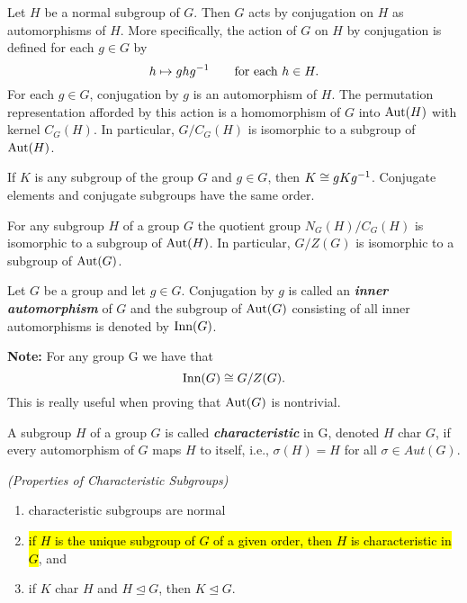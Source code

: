 \nl

\begin{prop}
Let $H$ be a normal subgroup of $G$. Then $G$ acts by conjugation on $H$ as automorphisms of $H$. More specifically, the action of $G$ on $H$ by conjugation is defined for each $g\in G$ by 
\[h\mapsto ghg^{-1}\qquad\text{for each } h\in H.\]
For each $g\in G$, conjugation by $g$ is an automorphism of $H$. The permutation representation afforded by this action is a homomorphism of $G$ into $\text{Aut}(H)$ with kernel $C_G(H)$. In particular, $G/C_G(H)$ is isomorphic to a subgroup of $\text{Aut}(H)$.
\end{prop}

\nl

\begin{cor}
If $K$ is any subgroup of the group $G$ and $g\in G$, then $K\cong gKg^{-1}$. Conjugate elements and conjugate subgroups have the same order.
\end{cor}

\nl

\begin{cor}
For any subgroup $H$ of a group $G$ the quotient group $N_G(H)/C_G(H)$ is isomorphic to a subgroup of $\text{Aut}(H)$. In particular, $G/Z(G)$ is isomorphic to a subgroup of $\text{Aut}(G)$.
\end{cor}

\nl

\begin{defn}
Let $G$ be a group and let $g\in G$. Conjugation by $g$ is called an \textbf{\textit{inner automorphism}} of $G$ and the subgroup of $\text{Aut}(G)$ consisting of all inner automorphisms is denoted by $\text{Inn}(G)$.
\end{defn}

\nl

\textbf{Note:} For any group G we have that 
\[\text{Inn}(G)\cong G/Z(G).\]
This is really useful when proving that $\text{Aut}(G)$ is nontrivial.

\nl

\begin{defn}
A subgroup $H$ of a group $G$ is called \textbf{\textit{characteristic}} in G, denoted $H$ char $G$, if every automorphism of $G$ maps $H$ to itself, i.e., $\sigma(H) = H$ for all $\sigma\in Aut(G)$.
\end{defn}

\nl

\begin{prop}\textit{(Properties of Characteristic Subgroups)}
\begin{enumerate}
\item characteristic subgroups are normal
\item \hl{if $H$ is the unique subgroup of $G$ of a given order, then $H$ is characteristic in $G$}, and 
\item if $K$ char $H$ and $H\unlhd G$, then $K\unlhd G$.
\end{enumerate}
\end{prop}

